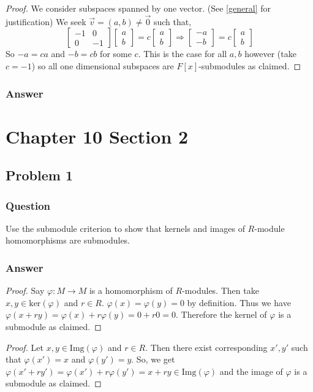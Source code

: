 \documentclass[12pt]{article}
\begin{document}
\begin{proof}We consider subspaces spanned by one vector. (See \ref{general} for justification) We seek $\vec{v} = (a,b) \neq \vec{0}$ such that, 
\[\left[ \begin{array} {lr}-1 & 0\\0 &-1 \end{array} \right] \left[ \begin{array} {lr}a\\ b \end{array} \right] = c \left[ \begin{array} {lr}a \\b \end{array} \right] \Rightarrow  \left[ \begin{array} {lr}-a \\-b \end{array} \right]  = c \left[ \begin{array} {lr}a \\b \end{array} \right]   \]
So $-a = ca$ and $-b = c b$ for some $c$. This is the case for all $a,b $ however (take $c= -1$) so all one dimensional subspaces are   $F[x]$-submodules as claimed.\end{proof}

\subsubsection{Answer}

\section{Chapter 10 Section 2}
\subsection{Problem 1}

\subsubsection{Question}
Use the submodule criterion to show that kernels and images of $R$-module homomorphisms are submodules.
\subsubsection{Answer}
\begin{proof} 
Say $\varphi: M \to M $ is a homomorphism of $R$-modules. Then take $x, y  \in \mathrm{ker}(\varphi)$ and $r \in R$. $\varphi(x) = \varphi(y) = 0$ by definition. Thus we have $\varphi(x+ r y)= \varphi(x)+ r \varphi(y) = 0+ r 0 = 0 $. Therefore the kernel of $\varphi$ is a submodule as claimed.
\end{proof}
\begin{proof} Let $x, y  \in \mathrm{Img}(\varphi)$ and $r \in R$. Then there exist corresponding $x', y'$ such that $\varphi(x')=x$ and $\varphi(y') = y$. So, we get $\varphi(x'+r y')= \varphi(x') + r\varphi(y') = x + r y \in \mathrm{Img}(\varphi)$ and the image of $\varphi$ is a submodule as claimed.
\end{proof}
\end{document}
